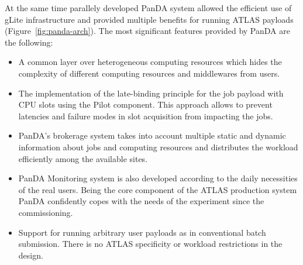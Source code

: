 \documentclass{webofc}
\begin{document}
At the same time parallely developed PanDA system  allowed the efficient use of gLite infrastructure and provided multiple benefits for running ATLAS payloads (Figure~\ref{fig:panda-arch}).
The most significant features provided by PanDA are the following: 

\begin{itemize}
	\item A common layer over heterogeneous computing resources which hides the complexity of different computing resources and middlewares from users.
	\item The implementation of the late-binding principle for the job payload with CPU slots using the Pilot component. This approach allows to prevent  latencies and failure modes in slot acquisition from impacting the jobs.
	\item PanDA's brokerage system takes into account multiple static and dynamic information about jobs and computing resources and distributes the workload efficiently among the available sites.
	\item PanDA Monitoring system is also developed according to the daily necessities of the real users. Being the core component of the ATLAS production system PanDA confidently copes with the needs of the experiment since the commissioning. 
	\item Support for running arbitrary user payloads as in conventional batch submission. There is no ATLAS specificity or workload restrictions in the design.
	
	
	

\end{itemize}
\end{document}
